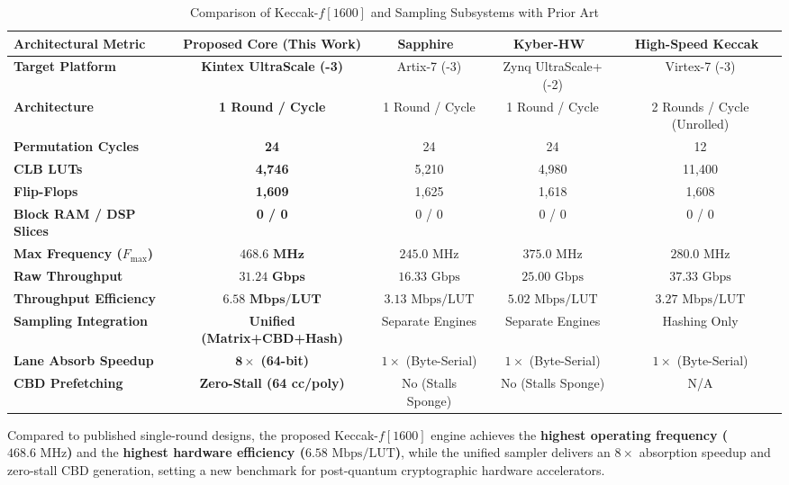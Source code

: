 \begin{table}[!t]
\caption{Comparison of Keccak-$f[1600]$ and Sampling Subsystems with Prior Art}
\label{tab:prior_art_comparison_keccak}
\centering
\footnotesize
\begin{tabular*}{\textwidth}{@{\extracolsep{\fill}} lcccc @{}}
\toprule
\textbf{Architectural Metric} & \textbf{Proposed Core (This Work)} & \textbf{Sapphire~\cite{banerjee2021sapphire}} & \textbf{Kyber-HW~\cite{imran2022tvlsi}} & \textbf{High-Speed Keccak~\cite{keccak_unroll_2020}} \\
\midrule
\textbf{Target Platform}        & \textbf{Kintex UltraScale (-3)} & Artix-7 (-3)        & Zynq UltraScale+ (-2) & Virtex-7 (-3) \\
\textbf{Architecture}           & \textbf{1 Round / Cycle}        & 1 Round / Cycle     & 1 Round / Cycle       & 2 Rounds / Cycle (Unrolled) \\
\textbf{Permutation Cycles}     & \textbf{24}                     & 24                  & 24                    & 12 \\
\textbf{CLB LUTs}               & \textbf{4,746}                  & 5,210               & 4,980                 & 11,400 \\
\textbf{Flip-Flops}             & \textbf{1,609}                  & 1,625               & 1,618                 & 1,608 \\
\textbf{Block RAM / DSP Slices} & \textbf{0 / 0}                  & 0 / 0               & 0 / 0                 & 0 / 0 \\
\textbf{Max Frequency ($F_{\max}$)} & $\mathbf{468.6\text{ MHz}}$   & $245.0\text{ MHz}$  & $375.0\text{ MHz}$    & $280.0\text{ MHz}$ \\
\textbf{Raw Throughput}         & $\mathbf{31.24\text{ Gbps}}$    & $16.33\text{ Gbps}$ & $25.00\text{ Gbps}$   & $37.33\text{ Gbps}$ \\
\textbf{Throughput Efficiency}  & $\mathbf{6.58\text{ Mbps/LUT}}$ & $3.13\text{ Mbps/LUT}$ & $5.02\text{ Mbps/LUT}$ & $3.27\text{ Mbps/LUT}$ \\
\midrule
\textbf{Sampling Integration}   & \textbf{Unified (Matrix+CBD+Hash)} & Separate Engines & Separate Engines       & Hashing Only \\
\textbf{Lane Absorb Speedup}    & $\mathbf{8\times}$ \textbf{(64-bit)} & $1\times$ (Byte-Serial) & $1\times$ (Byte-Serial) & $1\times$ (Byte-Serial) \\
\textbf{CBD Prefetching}        & \textbf{Zero-Stall (64 cc/poly)} & No (Stalls Sponge)  & No (Stalls Sponge)    & N/A \\
\bottomrule
\end{tabular*}
\end{table}

Compared to published single-round designs, the proposed Keccak-$f[1600]$ engine achieves the \textbf{highest operating frequency ($468.6\text{ MHz}$)} and the \textbf{highest hardware efficiency ($6.58\text{ Mbps/LUT}$)}, while the unified sampler delivers an $8\times$ absorption speedup and zero-stall CBD generation, setting a new benchmark for post-quantum cryptographic hardware accelerators.
